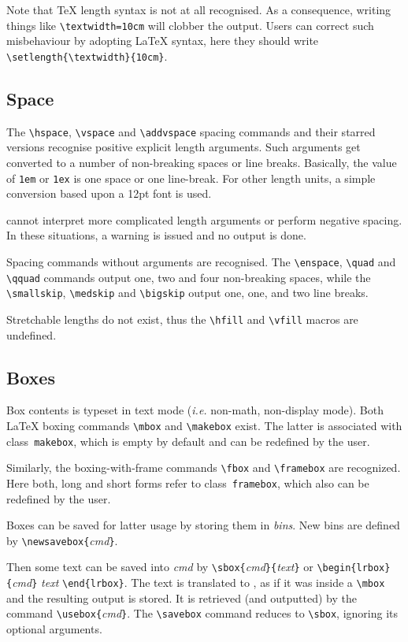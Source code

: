 Note that \TeX{} length syntax is not at all recognised. As a
consequence, writing things like \verb+\textwidth=10cm+ will clobber
the output.
Users can correct such misbehaviour by adopting \LaTeX{} syntax, here
they should write
\verb+\setlength{\textwidth}{10cm}+.


\subsection{Space}
The \verb+\hspace+, \verb+\vspace+ and \verb+\addvspace+ spacing
commands and their starred versions recognise positive explicit length
arguments.  Such arguments get converted to a number of non-breaking
spaces or line breaks.
Basically, the value of \verb+1em+ or \verb+1ex+ is one space or one
line-break. For other length units, a simple conversion based upon a
12pt font is used.


\hevea{} cannot interpret more complicated length arguments
or perform negative spacing.
In these situations, a warning is issued and no output is done.

Spacing commands without arguments are recognised.
The \verb+\enspace+, \verb+\quad+ and \verb+\qquad+ commands output
one, two and four non-breaking spaces, while the \verb+\smallskip+,
\verb+\medskip+ and \verb+\bigskip+ output one, one, and two line
breaks.

Stretchable lengths do not exist, thus the \verb+\hfill+ and
\verb+\vfill+ macros are undefined.


\subsection{Boxes}

Box contents is typeset in text mode (\emph{i.e.} non-math,
non-display mode).  Both \LaTeX{} boxing commands \verb+\mbox+ and
\verb+\makebox+ exist.  The latter is associated with
class~\verb+makebox+, which is empty by default and can be redefined
by the user.

Similarly, the boxing-with-frame commands \verb+\fbox+ and
\verb+\framebox+ are recognized.  Here both, long and short forms
refer to class~\verb+framebox+, which also can be redefined by the
user.

\smallskip

Boxes can be saved for latter usage by storing them in {\em bins}.
New bins are defined by \verb+\newsavebox{+{\it cmd}\verb+}+.

Then some text can be saved into {\it cmd} by
\verb+\sbox{+{\it cmd}\verb+}{+{\it text}\verb+}+ or
\verb+\begin{lrbox}{+\textit{cmd}\verb+}+ \textit{text} \verb+\end{lrbox}+.
The text is translated to \html{}, as if it was inside a \verb+\mbox+
and the resulting output is stored.
It is retrieved (and outputted) by the command
\verb+\usebox{+{\it cmd}\verb+}+.
The \verb+\savebox+ command reduces to \verb+\sbox+, ignoring its
optional arguments.

